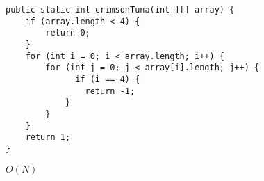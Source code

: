 \question
\begin{lstlisting}
public static int crimsonTuna(int[][] array) {
    if (array.length < 4) {
        return 0;
    }
    for (int i = 0; i < array.length; i++) {
        for (int j = 0; j < array[i].length; j++) {
              if (i == 4) {
                return -1;
            }
        }
    }
    return 1;
}
\end{lstlisting}

\begin{solution}[0.25in]
$O(N)$
\end{solution}